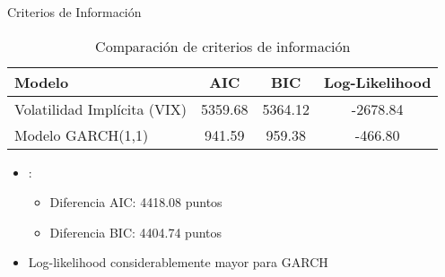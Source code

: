 \begin{frame}{Criterios de Información}
    \begin{table}
        \centering
        \begin{tabular}{lccc}
            \toprule
            \textbf{Modelo} & \textbf{AIC} & \textbf{BIC} & \textbf{Log-Likelihood} \\
            \midrule
            Volatilidad Implícita (VIX) & 5359.68 & 5364.12 & -2678.84 \\
            Modelo GARCH(1,1) & 941.59 & 959.38 & -466.80 \\
            \bottomrule
        \end{tabular}
        \caption{Comparación de criterios de información}
    \end{table}
    
    \vspace{0.5em}
    
    \begin{itemize}
        \item<2-> :
        \begin{itemize}
            \item Diferencia AIC: 4418.08 puntos
            \item Diferencia BIC: 4404.74 puntos
        \end{itemize}
        \item<3-> Log-likelihood considerablemente mayor para GARCH
    \end{itemize}
\end{frame}


